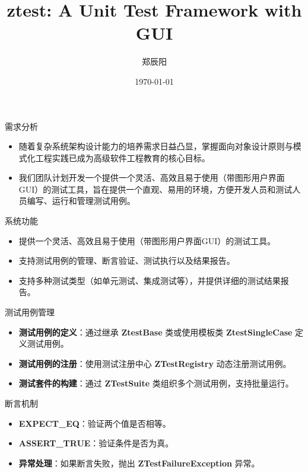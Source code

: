 \documentclass{beamer}
\title{ztest: A Unit Test Framework with GUI}
\author{郑辰阳}
\date{\today}
\begin{document}
\begin{frame}
    \titlepage
\end{frame}

\begin{frame}{需求分析}
    \begin{itemize}
        \item 随着复杂系统架构设计能力的培养需求日益凸显，掌握面向对象设计原则与模式化工程实践已成为高级软件工程教育的核心目标。
        \item 我们团队计划开发一个提供一个灵活、高效且易于使用（带图形用户界面GUI）的测试工具，旨在提供一个直观、易用的环境，方便开发人员和测试人员编写、运行和管理测试用例。
    \end{itemize}
\end{frame}

\begin{frame}{系统功能}
    \begin{itemize}
        \item 提供一个灵活、高效且易于使用（带图形用户界面GUI）的测试工具。
        \item 支持测试用例的管理、断言验证、测试执行以及结果报告。
        \item 支持多种测试类型（如单元测试、集成测试等），并提供详细的测试结果报告。
    \end{itemize}
\end{frame}

\begin{frame}{测试用例管理}
    \begin{itemize}
        \item \textbf{测试用例的定义}：通过继承 \textbf{ZtestBase} 类或使用模板类 \textbf{ZtestSingleCase} 定义测试用例。
        \item \textbf{测试用例的注册}：使用测试注册中心 \textbf{ZTestRegistry} 动态注册测试用例。
        \item \textbf{测试套件的构建}：通过 \textbf{ZTestSuite} 类组织多个测试用例，支持批量运行。
    \end{itemize}
\end{frame}

\begin{frame}{断言机制}
    \begin{itemize}
        \item \textbf{EXPECT\_EQ}：验证两个值是否相等。
        \item \textbf{ASSERT\_TRUE}：验证条件是否为真。
        \item \textbf{异常处理}：如果断言失败，抛出 \textbf{ZTestFailureException} 异常。
    \end{itemize}
\end{frame}
\end{document}
